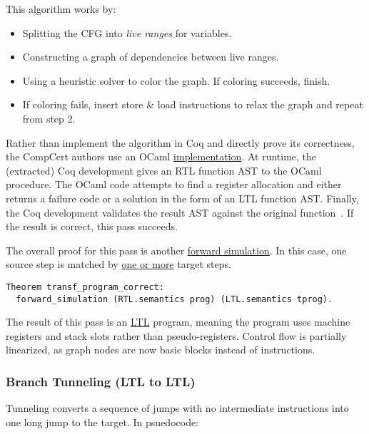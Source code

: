 This algorithm works by:
\begin{itemize}
\item Splitting the CFG into \emph{live ranges} for variables.
\item Constructing a graph of dependencies between live ranges.
\item Using a heuristic solver to color the graph. If coloring succeeds, finish.
\item If coloring fails, insert store \& load instructions to relax the graph and repeat from step 2.
\end{itemize}
Rather than implement the algorithm in Coq and directly prove its correctness, the CompCert authors use an OCaml \href{https://github.com/AbsInt/CompCert/blob/master/backend/Regalloc.ml}{implementation}.
At runtime, the (extracted) Coq development gives an RTL function AST to the OCaml procedure.
The OCaml code attempts to find a register allocation and either returns a failure code or a solution in the form of an LTL function AST.
Finally, the Coq development validates the result AST against the original function~\cite{rl-validating}.
If the result is correct, this pass succeeds.

The overall proof for this pass is another \href{https://github.com/AbsInt/CompCert/blob/master/backend/Allocproof.v#L2348}{forward simulation}.
In this case, one source step is matched by \href{https://github.com/AbsInt/CompCert/blob/master/backend/Allocproof.v#L1823}{one or more} target steps.
\begin{lstlisting}[style=Coq]
Theorem transf_program_correct:
  forward_simulation (RTL.semantics prog) (LTL.semantics tprog).
\end{lstlisting}

The result of this pass is an \href{https://github.com/AbsInt/CompCert/blob/master/backend/LTL.v}{LTL} program, meaning the program uses machine registers and stack slots rather than pseudo-registers.
Control flow is partially linearized, as graph nodes are now basic blocks instead of instructions.


\subsubsection{Branch Tunneling (LTL to LTL)}
Tunneling converts a sequence of jumps with no intermediate instructions into one long jump to the target.
In psuedocode:

